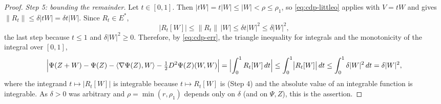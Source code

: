 \begin{proof}
\emph{Step 5: bounding the remainder.}
Let $t\in[0,1]$. Then $|tW|=t|W|\le|W|<\rho\le\rho_1$, so
\eqref{eq:cdp-littleo} applies with $V=tW$ and gives
$\|R_t\|\le\delta|tW|=\delta t|W|$. Since $R_t\in E^\ast$,
\[
  \bigl|R_t[W]\bigr|\le\|R_t\|\,|W|\le\delta t|W|^2\le\delta|W|^2 ,
\]
the last step because $t\le1$ and $\delta|W|^2\ge0$. Therefore, by
\eqref{eq:cdp-err}, the triangle inequality for integrals and the monotonicity
of the integral over $[0,1]$,
\[
  \Bigl|\Psi(Z+W)-\Psi(Z)-\langle\nabla\Psi(Z),W\rangle
    -\tfrac12D^2\Psi(Z)(W,W)\Bigr|
   =\Bigl|\int_0^1R_t[W]\,dt\Bigr|
   \le\int_0^1\bigl|R_t[W]\bigr|\,dt
   \le\int_0^1\delta|W|^2\,dt
   =\delta|W|^2 ,
\]
where the integrand $t\mapsto|R_t[W]|$ is integrable because $t\mapsto R_t[W]$
is (Step 4) and the absolute value of an integrable function is integrable. As
$\delta>0$ was arbitrary and $\rho=\min(r,\rho_1)$ depends only on $\delta$ (and
on $\Psi,Z$), this is the assertion.
\end{proof}
